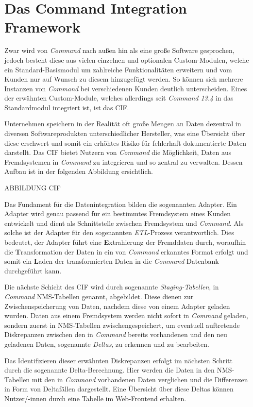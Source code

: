 \section{Das Command Integration Framework}\label{sec:cif}
Zwar wird von \textit{Command} nach außen hin als eine große Software gesprochen, jedoch besteht diese aus vielen einzelnen und optionalen Custom-Modulen, welche ein Standard-Basismodul um zahlreiche Funktionalitäten erweitern und vom Kunden nur auf Wunsch zu diesem hinzugefügt werden. So können sich mehrere Instanzen von \textit{Command} bei verschiedenen Kunden deutlich unterscheiden. Eines der erwähnten Custom-Module, welches allerdings seit \textit{Command 13.4} in das Standardmodul integriert ist, ist das \ac{CIF}.

Unternehmen speichern in der Realität oft große Mengen an Daten dezentral in diversen Softwareprodukten unterschiedlicher Hersteller, was eine Übersicht über diese erschwert und somit ein erhöhtes Risiko für fehlerhaft dokumentierte Daten darstellt. Das \ac{CIF} bietet Nutzern von \textit{Command} die Möglichkeit, Daten aus Fremdsystemen in \textit{Command} zu integrieren und so zentral zu verwalten. Dessen Aufbau ist in der folgenden Abbildung ersichtlich.

ABBILDUNG CIF

Das Fundament für die Datenintegration bilden die sogenannten Adapter. Ein Adapter wird genau passend für ein bestimmtes Fremdsystem eines Kunden entwickelt und dient als Schnittstelle zwischen Fremdsystem und \textit{Command}. Als solche ist der Adapter für den sogenannten \textit{ETL}-Prozess verantwortlich. Dies bedeutet, der Adapter führt eine \textbf{E}xtrahierung der Fremddaten durch, woraufhin die \textbf{T}ransformation der Daten in ein von \textit{Command} erkanntes Format erfolgt und somit ein \textbf{L}aden der transformierten Daten in die \textit{Command}-Datenbank durchgeführt kann.

Die nächste Schicht des \ac{CIF} wird durch sogenannte \textit{Staging-Tabellen}, in \textit{Command} \ac{NMS}-Tabellen genannt, abgebildet. Diese dienen zur Zwischenspeicherung von Daten, nachdem diese von einem Adapter geladen wurden. Daten aus einem Fremdsystem werden nicht sofort in \textit{Command} geladen, sondern zuerst in \ac{NMS}-Tabellen zwischengespeichert, um eventuell auftretende Diskrepanzen zwischen den in \textit{Command} bereits vorhandenen und den neu geladenen Daten, sogenannte \textit{Deltas}, zu erkennen und zu bearbeiten. 

Das Identifizieren dieser erwähnten Diskrepanzen erfolgt im nächsten Schritt durch die sogenannte Delta-Berechnung. Hier werden die Daten in den \ac{NMS}-Tabellen mit den in \textit{Command} vorhandenen Daten verglichen und die Differenzen in Form von Deltafällen dargestellt. Eine Übersicht über diese Deltas können Nutzer/-innen durch eine Tabelle im Web-Frontend erhalten.

